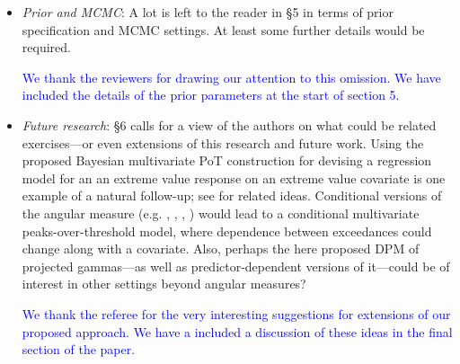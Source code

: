 \documentclass[10pt]{article}
\newcommand{\comment}[1]{\textcolor{teal}{#1}}
\newcommand{\bruno}[1]{\textcolor{red}{#1}}
\newcommand{\response}[1]{\textcolor{blue}{#1}}
\begin{document}
\begin{itemize}
\item \emph{Prior and MCMC}: A lot is left to the reader in §5 in terms of
    prior specification and MCMC settings.  At least some further details would 
    be required.

    \response{We thank the reviewers for drawing our attention to this omission.  We have 
    included the details of the prior parameters at the start of section 5.}

    

\item \emph{Future research}: §6 calls for a view of the authors on what 
    could be related exercises—or even extensions of this research and future 
    work. Using the proposed Bayesian multivariate PoT construction for 
    devising a regression model for an an extreme value response on an extreme 
    value covariate is one example of a natural follow-up; see 
    \cite{carvalho2022} for related ideas. Conditional versions of the angular 
    measure (e.g. \cite{carvalho2016}, \cite{castro2018}, \cite{escobar2018}, 
    \cite{mhalla2019}) would lead to a conditional multivariate 
    peaks-over-threshold model, where dependence between exceedances could 
    change along with a covariate. Also, perhaps the here proposed DPM of 
    projected gammas—as well as predictor-dependent versions of it—could be of 
    interest in other settings beyond angular measures?

\response{We thank the referee for the very interesting suggestions for extensions 
    of our proposed approach. We have a included a discussion of these ideas
    in the final section of the paper.
    }
    
\end{itemize}
\end{document}
